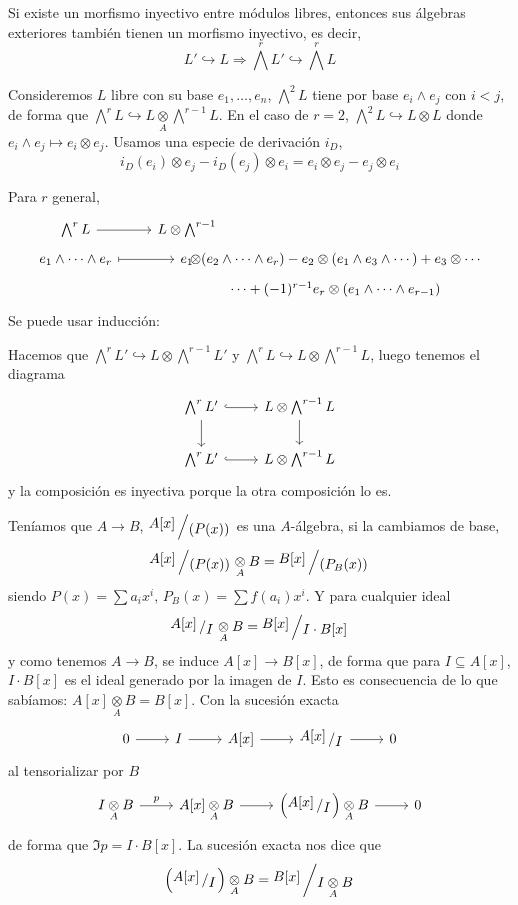 \begin{ejer}
    Si existe un morfismo inyectivo entre m\'odulos libres, entonces sus \'algebras exteriores tambi\'en tienen un morfismo inyectivo, es decir, 
    $$L' \hookrightarrow L \Rightarrow \bigwedge^r L' \hookrightarrow \bigwedge^r L$$
\end{ejer}
\begin{sol}
    Consideremos $L$ libre con su base $e_1, \ldots, e_n$, $\bigwedge^2L$ tiene por base $e_i \wedge e_j$ con $i<j$, de forma que $\bigwedge^r L \hookrightarrow L \underset{A}{\otimes} \bigwedge^{r-1} L$. En el caso de $r=2$, $\bigwedge^2L \hookrightarrow L \otimes L$ donde $e_i \wedge e_j \longmapsto e_i \otimes e_j$. Usamos una especie de derivaci\'on $i_D$, 
    $$i_D(e_i)\otimes e_j - i_D(e_j) \otimes e_i  = e_i \otimes e_j - e_j \otimes e_i$$

    Para $r$ general, 
    $$\bt \bigwedge^r L \rar & L \otimes \bigwedge^{r-1} \\[-5mm] e_1 \wedge \cdots \wedge e_r \rarmaps & e_1 &[-18mm] \otimes (e_2\wedge \cdots \wedge e_r) - e_2 \otimes (e_1\wedge e_3 \wedge \cdots ) + e_3 \otimes \cdots \\[-5mm] & &   \cdots + (-1)^{r-1} e_r \otimes (e_1\wedge \cdots \wedge e_{r-1})  \et$$
    Se puede usar inducci\'on:

    Hacemos que $\bigwedge^r L' \hookrightarrow L \otimes \bigwedge^{r-1}L'$ y $\bigwedge^r L \hookrightarrow L \otimes \bigwedge^{r-1}L$, luego tenemos el diagrama
    $$\bt \bigwedge^r L' \arrow{d} \rar[hook] &  L \otimes \bigwedge^{r-1}L \arrow{d} \\ \bigwedge^r L'\rar[hook] & L \otimes \bigwedge^{r-1}L \et$$
    y la composici\'on es inyectiva porque la otra composici\'on lo es.
\end{sol}

Ten\'iamos que $A \longrightarrow B$, $\modulo{A[x]}{(P(x))}$ es una $A$-\'algebra, si la cambiamos de base, $$\modulo{A[x]}{(P(x))} \underset{A}{\otimes} B = \modulo{B[x]}{(P_B(x))}$$
siendo $P(x) = \sum a_i x^i, \, P_B(x) = \sum f(a_i) x^i$. Y para cualquier ideal
$$\modulo{A[x]}{I} \underset{A}{\otimes} B = \modulo{B[x]}{I \cdot B[x]}$$
y como tenemos $A \longrightarrow B$, se induce $A[x] \longrightarrow B[x]$, de forma que para $I \subseteq A[x]$, $I\cdot B[x]$ es el ideal generado por la imagen de $I$. Esto es consecuencia de lo que sab\'iamos: $A[x] \underset{A}{\otimes} B = B[x]$. Con la sucesi\'on exacta
$$\bt 0 \rar & I \rar & A[x] \rar & \modulo{A[x]}{I} \rar & 0 \et$$
al tensorializar por $B$
$$\bt I\underset{A}{\otimes} B  \rar{p} & A[x]\underset{A}{\otimes} B  \rar &\left( \modulo{A[x]}{I} \right) \underset{A}{\otimes} B  \rar & 0 \et$$
de forma que $\Im p= I \cdot B[x]$. La sucesi\'on exacta nos dice que 
$$\left( \modulo{A[x]}{I} \right) \underset{A}{\otimes} B = \modulo{B[x]}{ I\underset{A}{\otimes} B}$$

